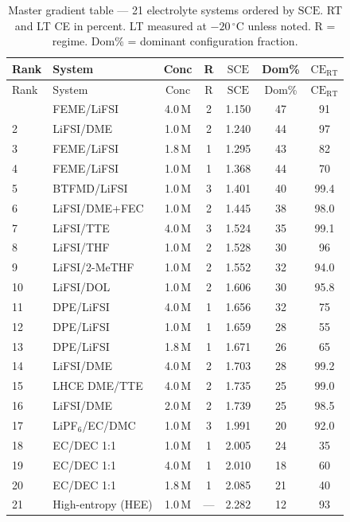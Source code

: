 \documentclass[12pt,letterpaper]{article}
\newcommand{\mSCE}{\mathrm{SCE}}
\begin{document}
\begin{longtable}{llccccc}
\caption{Master gradient table --- 21 electrolyte
systems ordered by $\mSCE$.
RT and LT CE in percent.
LT measured at $-20\,^{\circ}\mathrm{C}$ unless noted.
R = regime. Dom\% = dominant configuration fraction.}
\label{tab:master}\\
\toprule
Rank & System & Conc & R & $\mSCE$ & Dom\% &
$\mathrm{CE}_{\mathrm{RT}}$ \\
\midrule
\endfirsthead
\toprule
Rank & System & Conc & R & $\mSCE$ & Dom\% &
$\mathrm{CE}_{\mathrm{RT}}$ \\
\midrule
\endhead
\bottomrule
\endfoot
1  & FEME/LiFSI           & 4.0\,M & 2   & 1.150 & 47 & 91   \\
2  & LiFSI/DME            & 1.0\,M & 2   & 1.240 & 44 & 97   \\
3  & FEME/LiFSI           & 1.8\,M & 1   & 1.295 & 43 & 82   \\
4  & FEME/LiFSI           & 1.0\,M & 1   & 1.368 & 44 & 70   \\
5  & BTFMD/LiFSI          & 1.0\,M & 3   & 1.401 & 40 & 99.4 \\
6  & LiFSI/DME+FEC        & 1.0\,M & 2   & 1.445 & 38 & 98.0 \\
7  & LiFSI/TTE            & 4.0\,M & 3   & 1.524 & 35 & 99.1 \\
8  & LiFSI/THF            & 1.0\,M & 2   & 1.528 & 30 & 96   \\
9  & LiFSI/2-MeTHF        & 1.0\,M & 2   & 1.552 & 32 & 94.0 \\
10 & LiFSI/DOL            & 1.0\,M & 2   & 1.606 & 30 & 95.8 \\
11 & DPE/LiFSI            & 4.0\,M & 1   & 1.656 & 32 & 75   \\
12 & DPE/LiFSI            & 1.0\,M & 1   & 1.659 & 28 & 55   \\
13 & DPE/LiFSI            & 1.8\,M & 1   & 1.671 & 26 & 65   \\
14 & LiFSI/DME            & 4.0\,M & 2   & 1.703 & 28 & 99.2 \\
15 & LHCE DME/TTE         & 4.0\,M & 2   & 1.735 & 25 & 99.0 \\
16 & LiFSI/DME            & 2.0\,M & 2   & 1.739 & 25 & 98.5 \\
17 & LiPF$_{6}$/EC/DMC    & 1.0\,M & 3   & 1.991 & 20 & 92.0 \\
18 & EC/DEC 1:1           & 1.0\,M & 1   & 2.005 & 24 & 35   \\
19 & EC/DEC 1:1           & 4.0\,M & 1   & 2.010 & 18 & 60   \\
20 & EC/DEC 1:1           & 1.8\,M & 1   & 2.085 & 21 & 40   \\
21 & High-entropy (HEE)   & 1.0\,M & --- & 2.282 & 12 & 93   \\
\end{longtable}
\end{document}
